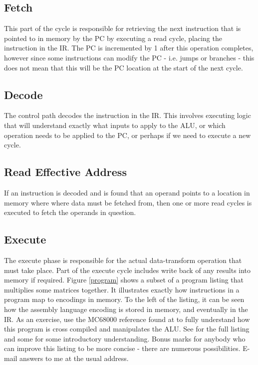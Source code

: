 \documentclass[10pt,a4paper]{article}
\begin{document}
\subsection{Fetch}
This part of the cycle is responsible for retrieving the next instruction that is pointed to in memory by the PC by executing a read cycle, placing the instruction in the IR. The PC is incremented by 1 after this operation completes, however since some instructions can modify the PC - i.e. jumps or branches - this does not mean that this will be the PC location at the start of the next cycle.   
\subsection{Decode}
The control path decodes the instruction in the IR. This involves executing logic that will understand exactly what inputs to apply to the ALU, or which operation needs to be applied to the PC, or perhaps if we need to execute a new cycle. 
\subsection{Read Effective Address}
If an instruction is decoded and is found that an operand points to a location in memory where where data must be fetched from, then one or more read cycles is executed to fetch the operands in question. 
\subsection{Execute}
The execute phase is responsible for the actual data-transform operation that must take place. Part of the execute cycle includes write back of any results into memory if required. 
\newline\newline
Figure \ref{program} shows a subset of a program listing that multiplies some matrices together. It illustrates exactly how instructions in a program map to encodings in memory. To the left of the listing, it can be seen how the assembly language encoding is stored in memory, and eventually in the IR. As an exercise, use the MC68000 reference found at \cite{68KREF} to fully understand how this program is cross compiled and manipulates the ALU. See \cite{LYNCH-68K} for the full listing and some for some introductory understanding. Bonus marks for anybody who can improve this listing to be more concise - there are numerous possibilities. E-mail answers to me at the usual address. 
\end{document}
